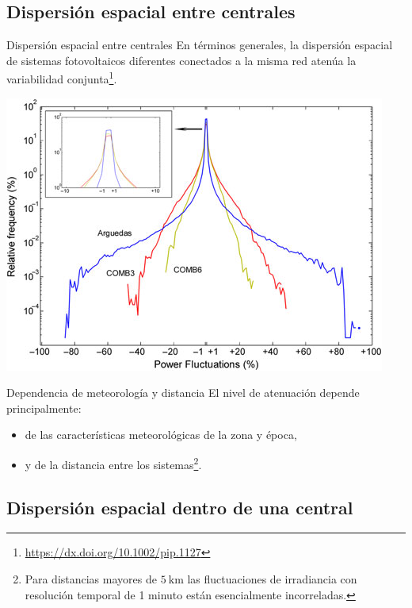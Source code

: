 \documentclass[aspectratio=169, usenames,svgnames,dvipsnames]{beamer}
\begin{document}
\subsection{Dispersión espacial entre centrales}
\label{sec:org37ac106}
\begin{frame}[label={sec:org6beb027}]{Dispersión espacial entre centrales}
En términos generales, la \alert{dispersión espacial de sistemas
fotovoltaicos diferentes} conectados a la misma red \alert{atenúa} la
variabilidad conjunta\footnote{\url{https://dx.doi.org/10.1002/pip.1127}}.

\begin{center}
\includegraphics[height=0.7\textheight]{../figs/Variabilidad_DispersionGeografica_Plantas.png}
\end{center}
\end{frame}

\begin{frame}[label={sec:orgd98c4a9}]{Dependencia de meteorología y distancia}
El \alert{nivel de atenuación depende} principalmente:
\begin{itemize}
\item de las \alert{características meteorológicas} de la zona y época,
\item y de la \alert{distancia} entre los sistemas\footnote{Para \alert{distancias mayores de \(\SI{5}{\kilo\meter}\)} las
fluctuaciones de irradiancia con resolución temporal de 1 minuto
están esencialmente \alert{incorreladas}.}.
\end{itemize}
\end{frame}

\subsection{Dispersión espacial dentro de una central}
\label{sec:org792acf6}
\end{document}

